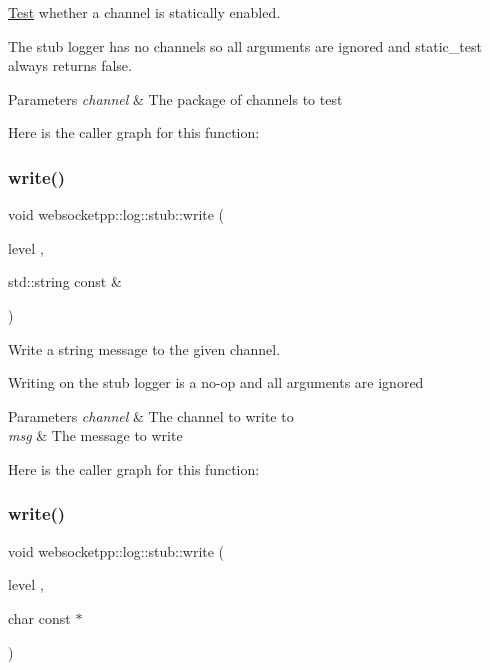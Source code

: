 \mbox{\hyperlink{struct_test}{Test}} whether a channel is statically enabled. 

The stub logger has no channels so all arguments are ignored and {\ttfamily static\+\_\+test} always returns false.


\begin{DoxyParams}{Parameters}
{\em channel} & The package of channels to test \\
\hline
\end{DoxyParams}
Here is the caller graph for this function\+:
\mbox{\label{classwebsocketpp_1_1log_1_1stub_ae14dd42a83305f2dd9c03fc5018c88ee}} 
\subsubsection{\texorpdfstring{write()}{write()}\hspace{0.1cm}{\footnotesize\ttfamily [1/2]}}
{\footnotesize\ttfamily void websocketpp\+::log\+::stub\+::write (\begin{DoxyParamCaption}\item[{level}]{,  }\item[{std\+::string const \&}]{ }\end{DoxyParamCaption})\hspace{0.3cm}{\ttfamily [inline]}}



Write a string message to the given channel. 

Writing on the stub logger is a no-\/op and all arguments are ignored


\begin{DoxyParams}{Parameters}
{\em channel} & The channel to write to \\
\hline
{\em msg} & The message to write \\
\hline
\end{DoxyParams}
Here is the caller graph for this function\+:
\mbox{\label{classwebsocketpp_1_1log_1_1stub_a6c6844e088cfc64d9945348a52a86c73}} 
\subsubsection{\texorpdfstring{write()}{write()}\hspace{0.1cm}{\footnotesize\ttfamily [2/2]}}
{\footnotesize\ttfamily void websocketpp\+::log\+::stub\+::write (\begin{DoxyParamCaption}\item[{level}]{,  }\item[{char const $\ast$}]{ }\end{DoxyParamCaption})\hspace{0.3cm}{\ttfamily [inline]}}




